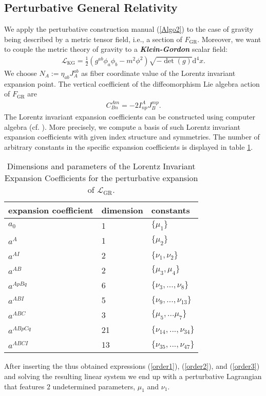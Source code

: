 \documentclass[%
preprint,
titlepage,
nofootinbib,
amsmath,amssymb,
showkeys,
aps,
prd,
floatfix,
]{revtex4-2}
\begin{document}
\subsection{Perturbative General Relativity}
We apply the perturbative construction manual (\ref{Algo2}) to the case of gravity being described by a metric tensor field, i.e., a section of $F_{\text{GR}}$. 
Moreover, we want to couple the metric theory of gravity to a \textit{\textbf{Klein-Gordon}} scalar field:
\begin{align}\label{KGL}
    \mathcal{L}_{\text{KG}} = \frac{1}{2} \left ( g^{ab} \phi_a \phi_b - m^2 \phi^2\right )\sqrt{-\operatorname{det}(g)} \mathrm{d}^4x.
\end{align}
We choose $N_A := \eta_{ab} J_A^{ab} $ as fiber coordinate value of the Lorentz invariant expansion point. The vertical coefficient of the diffeomorphism Lie algebra action of $F_{\text{GR}}$ are
\begin{align}
    C^{Am}_{Bn} = -2 I^A_{np} J_B^{mp}.
\end{align}
The Lorentz invariant expansion coefficients can be constructed using computer algebra (cf. \cite{sparse-tensor}). More precisely, we compute a basis of such Lorentz invariant expansion coefficients with given index structure and symmetries. The number of arbitrary constants in the
specific expansion coefficients is displayed in table \ref{GRExp}.
\begin{table}
\centering 
\begin{tabular}{lll}\toprule
    expansion coefficient & dimension & constants   \\ \midrule
    $a_0$ & 1 & $\{\mu_1\}$ \\
    $a^A$ & 1 & $\{\mu_2\}$ \\
    $a^{AI}$ & 2 & $\{\nu_1, \nu_2\}$ \\
    $a^{AB}$ & 2 & $\{\mu_3, \mu_4 \} $ \\
    $a^{ApBq}$ & 6 & $\{\nu_3,...,\nu_8\}$ \\
    $a^{ABI}$ & 5 & $\{ \nu_9,...,\nu_{13} \}$ \\
    $a^{ABC}$ & 3 & $\{ \mu_5,...\mu_7 \}$\\
    $a^{ABpCq}$ & 21 & $\{\nu_{14},...,\nu_{34} \}$ \\
    $a^{ABCI}$ & 13 & $\{ \nu_{35},...,\nu_{47}\}$\\ \bottomrule
\end{tabular}
\caption{Dimensions and parameters of the Lorentz Invariant Expansion Coefficients for the perturbative expansion of $\mathcal{L}_{\text{GR}}$.}\label{GRExp}
\end{table}
After inserting the thus obtained expressions (\ref{order1}), (\ref{order2}), and (\ref{order3}) and solving the resulting linear system we end up with a perturbative Lagrangian that features $2$ undetermined parameters, $\mu_1$ and $\nu_1$. 
\end{document}
